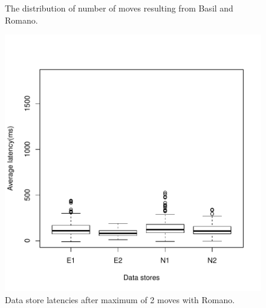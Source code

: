 \begin{figure}[!t]
\centering
{}
\caption{
The distribution of number of moves resulting from Basil and Romano.
}
\label{moves}
\end{figure}
\begin{figure}[!t]
\centering
\includegraphics[width=\textwidth]{figure/romano_latency_2moves.pdf}
\caption{Data store latencies after maximum of 2 moves with Romano.}
\label{two}
\end{figure}
